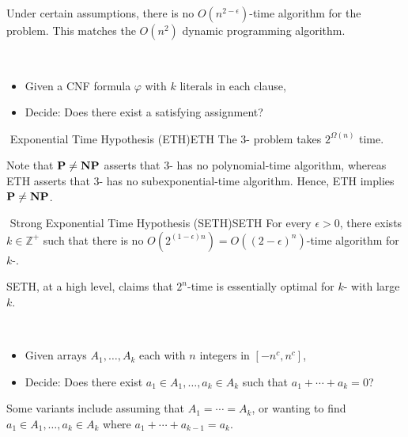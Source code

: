         \begin{example}
            Under certain assumptions, there is no \(O(n^{2-\epsilon})\)-time algorithm for the  problem. This matches the \(O(n^2)\) dynamic programming algorithm.
        \end{example}
        \pagebreak
        \begin{compprob} \label{prob:ksat}
            \vphantom
            \\
            \begin{itemize}
                \item Given a CNF formula \(\varphi\) with \(k\) literals in each clause,
                \item Decide: Does there exist a satisfying assignment?
            \end{itemize}
        \end{compprob}
        \begin{hypothesis}{\Stop\,\,Exponential Time Hypothesis (ETH)}{ETH}
            The \(3\)- problem takes \(2^{\Omega(n)}\) time.
        \end{hypothesis}
        \begin{remark*}
            Note that \(\mathbf{P}\neq\mathbf{NP}\) asserts that \(3\)- has no polynomial-time algorithm, whereas ETH asserts that \(3\)- has no subexponential-time algorithm. Hence, ETH implies \(\mathbf{P}\neq\mathbf{NP}\).
        \end{remark*}
        \begin{hypothesis}{\Stop\,\,Strong Exponential Time Hypothesis (SETH)}{SETH}
            For every \(\epsilon>0\), there exists \(k\in\mathbb{Z}^+\) such that there is no \(O\left(2^{(1-\epsilon)n}\right)=O((2-\epsilon)^n)\)-time algorithm for \(k\)-.
        \end{hypothesis}
        \begin{remark*}
            SETH, at a high level, claims that \(2^n\)-time is essentially optimal for \(k\)- with large \(k\).
        \end{remark*}
        \begin{compprob} \label{prob:ksum}
            \vphantom
            \\
            \begin{itemize}
                \item Given arrays \(A_1,\ldots,A_k\) each with \(n\) integers in \([-n^c,n^c]\),
                \item Decide: Does there exist \(a_1\in A_1,\ldots, a_k\in A_k\) such that \(a_1+\cdots+a_k=0\)?
            \end{itemize}
            Some variants include assuming that \(A_1=\cdots=A_k\), or wanting to find \(a_1\in A_1,\ldots, a_k\in A_k\) where \(a_1+\cdots+a_{k-1}=a_k\).
        \end{compprob}

